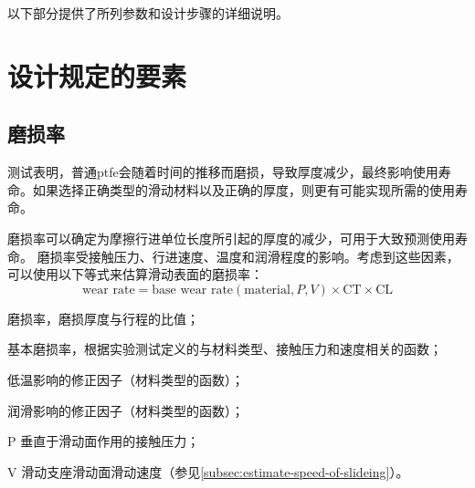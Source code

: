 以下部分提供了所列参数和设计步骤的详细说明。

\section{设计规定的要素}
\subsection{磨损率}
\label{subsec:wear-rate}
测试表明，普通\acrlong*{ptfe}会随着时间的推移而磨损，导致厚度减少，最终影响使用寿命。如果选择正确类型的滑动材料以及正确的厚度，则更有可能实现所需的使用寿命。

磨损率可以确定为摩擦行进单位长度所引起的厚度的减少，可用于大致预测使用寿命。 磨损率受接触压力、行进速度、温度和润滑程度的影响。考虑到这些因素，可以使用以下等式来估算滑动表面的磨损率：
\begin{equation}
  \label{eq:wear-rate}
  \text{wear rate}=\text{base wear rate}(\text{material} ,P,V)\times \text{CT} \times \text{CL}
\end{equation}
\begin{EqDesc}{}
  \item [\text{wear rate}] 磨损率，磨损厚度与行程的比值；
  \item [\text{base wear rate}] 基本磨损率，根据实验测试定义的与材料类型、接触压力和速度相关的函数；
  \item [\text{CT}] 低温影响的修正因子（材料类型的函数）；
  \item [\text{CL}] 润滑影响的修正因子（材料类型的函数）；
  \item [P] 垂直于滑动面作用的接触压力；
  \item [V] 滑动支座滑动面滑动速度（参见\cref{subsec:estimate-speed-of-slideing}）。
\end{EqDesc}

